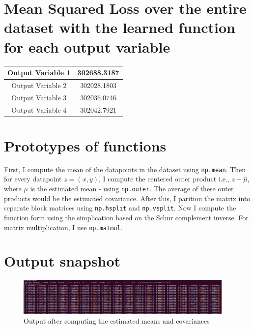 \documentclass{article}
\begin{document}
\section*{Mean Squared Loss over the entire dataset with the learned function for each output variable}
\begin{center}
\begin{tabular}{|c|c|}
\hline
Output Variable 1 & 302688.3187 \\ \hline Output Variable 2 & 302028.1803 \\
\hline
Output Variable 3 & 302036.0746 \\ \hline Output Variable 4 & 302042.7921 \\
\hline
\end{tabular}
\end{center}

\section*{Prototypes of functions}
First, I compute the mean of the datapoints in the dataset using \texttt{np.mean}. Then for every datapoint \(z = (x, y)\), I compute the centered outer product i.e., \(z - \hat{\mu}\), where \(\mu\) is the estimated mean - using \texttt{np.outer}. The average of these outer products would be the estimated covariance. After this, I parition the matrix into separate block matrices using \texttt{np.hsplit} and \texttt{np.vsplit}. Now I compute the function form using the simplication based on the Schur complement inverse. For matrix multiplication, I use \texttt{np.matmul}.

\section*{Output snapshot}
\begin{figure}[H]
\includegraphics[width=0.95\textwidth]{./images/output-1.png}
\caption{Output after computing the estimated means and covariances}
\end{figure}
\end{document}

